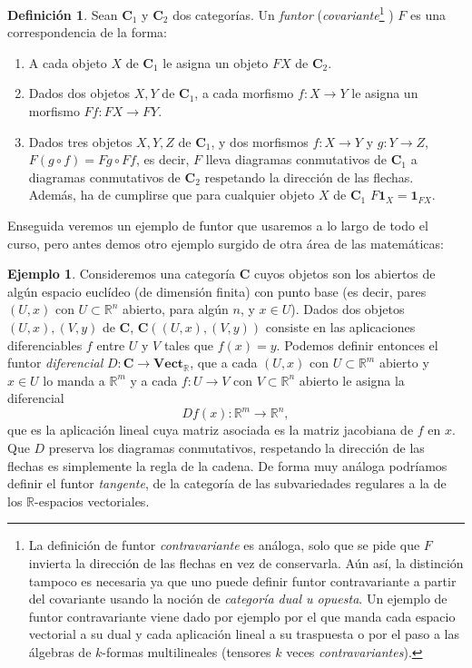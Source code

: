 \documentclass[12pt,a4paper]{book}
\theoremstyle{definition} \newtheorem{defn}[thm]{Definición}
\theoremstyle{definition} \newtheorem{ejemplo}[thm]{Ejemplo}
\theoremstyle{definition} \newtheorem{ejercicio}[thm]{Ejercicio}
\theoremstyle{remark} \newtheorem*{obs}{Observación}
\def\RR{\mathbb{R}}
\def\id{\mathbf{1}}
\def\cat{\mathbf{C}}
\begin{document}
\begin{defn}
  Sean $\cat_1$ y $\cat_2$ dos categorías. Un \emph{funtor} (\emph{covariante}\footnote{La definición de funtor \emph{contravariante} es análoga, solo que se pide que $F$ invierta la dirección de las flechas en vez de conservarla. Aún así, la distinción tampoco es necesaria ya que uno puede definir funtor contravariante a partir del covariante usando la noción de \emph{categoría dual u opuesta}. Un ejemplo de funtor contravariante viene dado por ejemplo por el que manda cada espacio vectorial a su dual y cada aplicación lineal a su traspuesta o por el paso a las álgebras de $k$-formas multilineales (tensores $k$ veces \emph{contravariantes}).} ) $F$ es una correspondencia de la forma:
  \begin{enumerate}
    \item A cada objeto $X$ de $\cat_1$ le asigna un objeto $FX$ de $\cat_2$.
    \item Dados dos objetos $X,Y$ de $\cat_1$, a cada morfismo $f:X\rightarrow Y$ le asigna un morfismo $Ff:FX\rightarrow FY$.
    \item Dados tres objetos $X,Y,Z$ de $\cat_1$, y dos morfismos $f:X\rightarrow Y$ y $g:Y\rightarrow Z$, $F(g\circ f)=Fg \circ Ff$, es decir, $F$ lleva diagramas conmutativos de $\cat_1$ a diagramas conmutativos de $\cat_2$ respetando la dirección de las flechas. Además, ha de cumplirse que para cualquier objeto $X$ de $\cat_1$ $F\id_X=\id_{FX}$.
  \end{enumerate}
\end{defn}

Enseguida veremos un ejemplo de funtor que usaremos a lo largo de todo el curso, pero antes demos otro ejemplo surgido de otra área de las matemáticas:

\begin{ejemplo}
  Consideremos una categoría $\cat$ cuyos objetos son los abiertos de algún espacio euclídeo (de dimensión finita) con punto base (es decir, pares $(U,x)$ con $U\subset \RR^n$ abierto, para algún $n$, y $x\in U$). Dados dos objetos $(U,x), (V,y)$ de $\cat$, $\cat(\left( U,x \right),(V,y))$ consiste en las aplicaciones diferenciables $f$ entre $U$ y $V$ tales que $f(x)=y$. Podemos definir entonces el funtor \emph{diferencial} $D:\cat \rightarrow \mathbf{Vect}_{\RR}$, que a cada $(U,x)$ con $U \subset \RR^m$ abierto y $x \in U$ lo manda a $\RR^m$ y a cada $f:U \rightarrow V$ con $V \subset \RR^n$ abierto le asigna la diferencial
  \begin{equation*}
    Df(x): \RR^m \longrightarrow \RR^n,
  \end{equation*}
  que es la aplicación lineal cuya matriz asociada es la matriz jacobiana de $f$ en $x$.
  Que $D$ preserva los diagramas conmutativos, respetando la dirección de las flechas es simplemente la regla de la cadena. De forma muy análoga podríamos definir el funtor \emph{tangente}, de la categoría de las subvariedades regulares a la de los $\RR$-espacios vectoriales.
\end{ejemplo}
\end{document}
